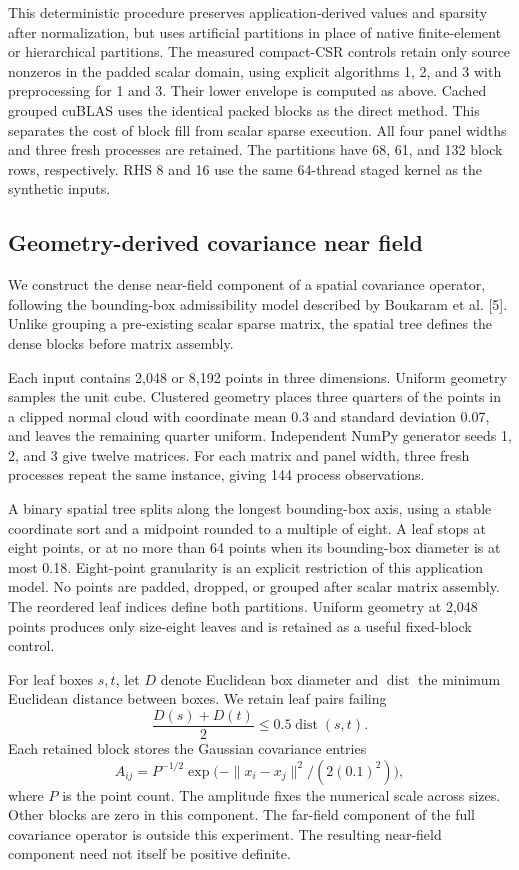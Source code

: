 \documentclass[10pt]{article}
\begin{document}
This deterministic procedure preserves application-derived values and
sparsity after normalization, but uses artificial partitions in place of native
finite-element or hierarchical partitions. The measured compact-CSR controls retain only
source nonzeros in the padded scalar domain, using explicit algorithms 1,
2, and 3 with preprocessing for 1 and 3. Their lower envelope is computed
as above. Cached grouped cuBLAS uses the identical packed blocks as the
direct method. This separates the cost of block fill from scalar sparse
execution. All four panel widths and three fresh processes are retained. The partitions
have 68, 61, and 132 block rows, respectively. RHS 8 and 16 use the same
64-thread staged kernel as the synthetic inputs.

\subsection{Geometry-derived covariance near field}
We construct the dense near-field component of a spatial covariance
operator, following the bounding-box admissibility model described by
Boukaram et al. [5]. Unlike grouping a pre-existing scalar sparse matrix,
the spatial tree defines the dense blocks before matrix assembly.

Each input contains 2,048 or 8,192 points in three dimensions. Uniform
geometry samples the unit cube. Clustered geometry places three quarters
of the points in a clipped normal cloud with coordinate mean 0.3 and
standard deviation 0.07, and leaves the remaining quarter uniform.
Independent NumPy generator seeds 1, 2, and 3 give twelve matrices.
For each matrix and panel width, three fresh processes repeat the same
instance, giving 144 process observations.

A binary spatial tree splits along the longest bounding-box axis, using
a stable coordinate sort and a midpoint rounded to a multiple of eight.
A leaf stops at eight points, or at no more than 64 points when its
bounding-box diameter is at most 0.18. Eight-point granularity is an
explicit restriction of this application model. No points are padded,
dropped, or grouped after scalar matrix assembly. The reordered leaf
indices define both partitions. Uniform geometry at 2,048 points produces
only size-eight leaves and is retained as a useful fixed-block control.

For leaf boxes \(s,t\), let \(D\) denote Euclidean box diameter and
\(\operatorname{dist}\) the minimum Euclidean distance between boxes.
We retain leaf pairs failing
\[
  \frac{D(s)+D(t)}{2}\leq 0.5\operatorname{dist}(s,t).
\]
Each retained block stores the Gaussian covariance entries
\[
 A_{ij}=P^{-1/2}\exp\bigl(-\|x_i-x_j\|^2/(2(0.1)^2)\bigr),
\]
where \(P\) is the point count. The amplitude fixes the numerical scale
across sizes. Other blocks are zero in this component. The far-field
component of the full covariance operator is outside this experiment.
The resulting near-field component need not itself be positive definite.
\end{document}
